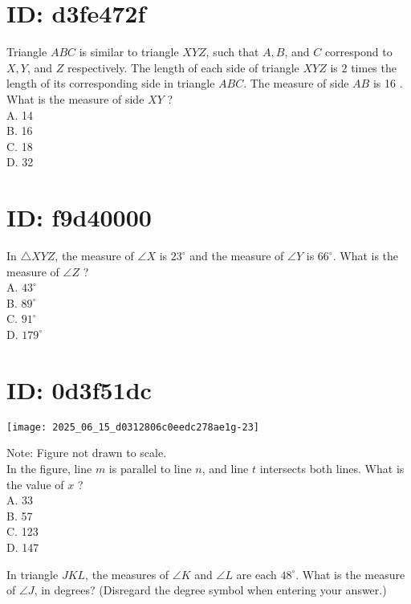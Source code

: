 















\section*{ID: d3fe472f}
Triangle $A B C$ is similar to triangle $X Y Z$, such that $A, B$, and $C$ correspond to $X, Y$, and $Z$ respectively. The length of each side of triangle $X Y Z$ is 2 times the length of its corresponding side in triangle $A B C$. The measure of side $A B$ is 16 . What is the measure of side $X Y$ ?\\
A. 14\\
B. 16\\
C. 18\\
D. 32

\section*{ID: f9d40000}
In $\triangle X Y Z$, the measure of $\angle X$ is $23^{\circ}$ and the measure of $\angle Y$ is $66^{\circ}$. What is the measure of $\angle Z$ ?\\
A. $43^{\circ}$\\
B. $89^{\circ}$\\
C. $91^{\circ}$\\
D. $179^{\circ}$

\section*{ID: 0d3f51dc}
\begin{center}
\texttt{[image: 2025\_06\_15\_d0312806c0eedc278ae1g-23]}
\end{center}

Note: Figure not drawn to scale.\\
In the figure, line $m$ is parallel to line $n$, and line $t$ intersects both lines. What is the value of $x$ ?\\
A. 33\\
B. 57\\
C. 123\\
D. 147

In triangle $J K L$, the measures of $\angle K$ and $\angle L$ are each $48^{\circ}$. What is the measure of $\angle J$, in degrees? (Disregard the degree symbol when entering your answer.)

